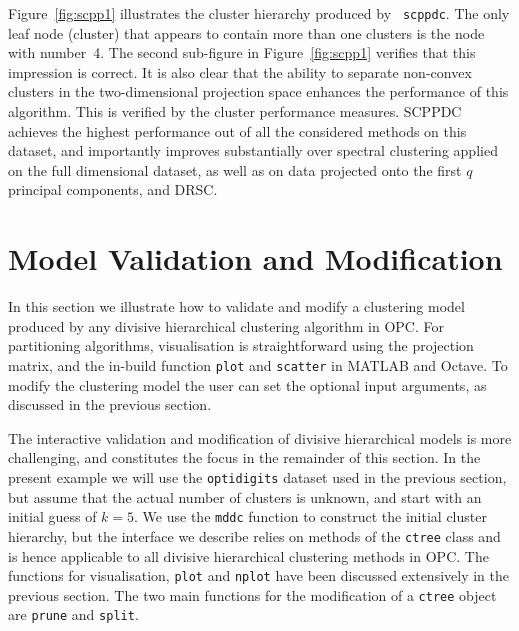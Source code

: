 \documentclass{book}
\begin{document}
\noindent
%
Figure~\ref{fig:scpp1} illustrates the cluster hierarchy produced by {\tt
scppdc}.
%
%
The only leaf node (cluster) that appears to contain more than one clusters is
the node with number~4. The second sub-figure in Figure~\ref{fig:scpp1}
verifies that this impression is correct. It is also clear that the ability to
separate non-convex clusters in the two-dimensional projection space
enhances the performance of this algorithm.
%
This is verified by the cluster performance measures. SCPPDC achieves the
highest performance out of all the considered methods on this dataset, and
importantly improves substantially over spectral clustering applied on the full
dimensional dataset, as well as on data projected onto the first $q$ principal
components, and DRSC.







\chapter{Model Validation and Modification}\label{sec:valid}

In this section we illustrate how to validate and modify a clustering model
produced by any divisive hierarchical clustering algorithm in OPC.
%
For partitioning algorithms, visualisation is straightforward using the
projection matrix, and the in-build function {\tt plot} and {\tt scatter} in
MATLAB and Octave. To modify the clustering model the
user can set the optional input arguments, as discussed in the previous
section.
%

The interactive validation and modification of divisive hierarchical models
is more challenging, and constitutes the focus in the remainder
of this section.
%
In the present example we will use the {\tt optidigits} dataset used in the
previous section, but assume that the actual number of clusters is unknown,
and start with an initial guess of $k=5$.
%
We use the {\tt mddc} function to construct the initial cluster
hierarchy, but the interface we describe relies on methods of the
{\tt ctree} class and is hence applicable to
all divisive hierarchical clustering methods in OPC.
%
The functions for visualisation, {\tt plot} and {\tt nplot}
have been discussed extensively in the previous
section.
The two main functions for the modification of a {\tt ctree} object are
{\tt prune} and {\tt split}.
\end{document}
